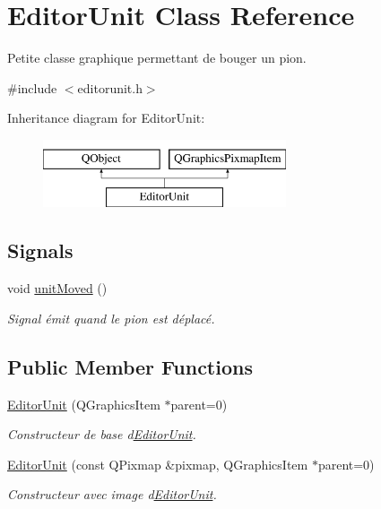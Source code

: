 \hypertarget{class_editor_unit}{}\section{Editor\+Unit Class Reference}
\label{class_editor_unit}


Petite classe graphique permettant de bouger un pion.  




{\ttfamily \#include $<$editorunit.\+h$>$}

Inheritance diagram for Editor\+Unit\+:\begin{figure}[H]
\begin{center}
\leavevmode
\includegraphics[height=2.000000cm]{class_editor_unit}
\end{center}
\end{figure}
\subsection*{Signals}
\begin{DoxyCompactItemize}
\item 
\hypertarget{class_editor_unit_af4123d742666cb6965f5ea1059ae8631}{}void \hyperlink{class_editor_unit_af4123d742666cb6965f5ea1059ae8631}{unit\+Moved} ()\label{class_editor_unit_af4123d742666cb6965f5ea1059ae8631}

\begin{DoxyCompactList}\small\item\em Signal émit quand le pion est déplacé. \end{DoxyCompactList}\end{DoxyCompactItemize}
\subsection*{Public Member Functions}
\begin{DoxyCompactItemize}
\item 
\hyperlink{class_editor_unit_a3e61a5acc86cfe38923885cd3b16def7}{Editor\+Unit} (Q\+Graphics\+Item $\ast$parent=0)
\begin{DoxyCompactList}\small\item\em Constructeur de base d\textquotesingle{}\hyperlink{class_editor_unit}{Editor\+Unit}. \end{DoxyCompactList}\item 
\hyperlink{class_editor_unit_a96e5806d5fdf9e99605b9545cb26d2cd}{Editor\+Unit} (const Q\+Pixmap \&pixmap, Q\+Graphics\+Item $\ast$parent=0)
\begin{DoxyCompactList}\small\item\em Constructeur avec image d\textquotesingle{}\hyperlink{class_editor_unit}{Editor\+Unit}. \end{DoxyCompactList}\end{DoxyCompactItemize}
